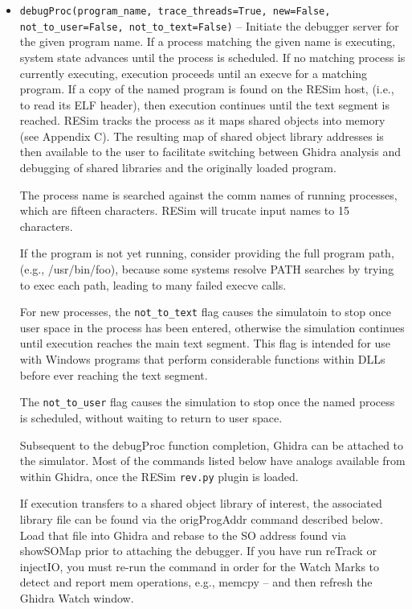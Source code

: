 \documentclass[titlepage]{article}
\begin{document}
\begin{itemize}

\item {\tt debugProc(program\_name, trace\_threads=True, new=False, not\_to\_user=False, not\_to\_text=False)} – Initiate the debugger server for the given program name.  If a process matching the given name is executing, system state advances until the process is scheduled.  If no matching process is currently executing, execution proceeds until an execve for a matching program.   If a copy of the named program is found on the RESim host, (i.e., to read its ELF header), then execution continues until the text segment is reached.  RESim tracks the process as it maps shared objects into memory (see Appendix C).  The resulting map of shared object library addresses is then available to the user to facilitate switching between Ghidra analysis and debugging of shared libraries and the originally loaded program.

The process name is searched against the comm names of running processes, which are fifteen characters.  RESim will trucate input names to 15 characters.

If the program is not yet running, consider providing the full program path, (e.g., /usr/bin/foo), because some systems resolve PATH searches by trying
to exec each path, leading to many failed execve calls.

For new processes, the {\tt not\_to\_text} flag causes the simulatoin to stop once user space in the process has been entered, otherwise the simulation continues until execution
reaches the main text segment.  This flag is intended for use with Windows programs that perform considerable functions within DLLs before ever reaching the text segment.

The {\tt not\_to\_user} flag causes the simulation to stop once the named process is scheduled, without waiting to return to user space.  

Subsequent to the debugProc  function completion, Ghidra can be attached to the simulator.  Most of the commands listed below have analogs available from within Ghidra, once the RESim {\tt rev.py} plugin is loaded.

If execution transfers to a shared object library of interest, the associated library file can be found via the origProgAddr command described below.  Load that file into Ghidra and rebase to the SO address
found via showSOMap prior to attaching the debugger.  If you have run reTrack or injectIO, you must re-run the command in order for the Watch Marks to 
detect and report mem operations, e.g., memcpy -- and then refresh the Ghidra Watch window. 


\end{itemize}
\end{document}
